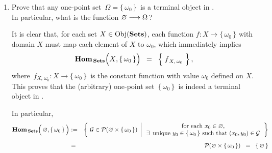 \begin{enumerate}
\item
	Prove that any one-point set \,$\Omega = \{\,\omega_{0}\,\}$\, is a terminal object in \Sets.\\
	In particular, what is the function $\varnothing \longrightarrow \Omega$\,?
	
	\proof
	It is clear that, for each set $X \in \textnormal{Obj}(\textbf{Sets})$, each function $f : X \longrightarrow \{\,\omega_{0}\,\}$
	with domain $X$ must map each element of $X$ to $\omega_{0}$, which immediately implies
	\begin{equation*}
	\Hom_{\,\Sets}\!\left(\overset{{\color{white}.}}{X},\{\,\omega_{0}\,\}\right)
	\;\; = \;\;
		\left\{\; \overset{{\color{white}.}}{f}_{X,\,\omega_{0}} \;\right\},
	\end{equation*}
	where \,$f_{X,\,\omega_{0}} : X \longrightarrow \{\,\omega_{0}\,\}$\,
	is the constant function with value $\omega_{0}$ defined on $X$.
	This proves that the (arbitrary) one-point set \,$\{\,\omega_{0}\,\}$\, is indeed a terminal object in \Sets.
	
	In particular,
	\begin{eqnarray*}
	\Hom_{\,\Sets}\!\left(\,\overset{{\color{white}.}}{\varemptyset},\{\,\omega_{0}\,\}\,\right)
	& := &
		\left\{\;
			\mathcal{G} \in \mathcal{P}(\varemptyset \times \{\,\omega_{0}\,\})
			\;\left\vert\,
			\begin{array}{c}
				\textnormal{for each $x_{0} \in \varemptyset$,}
				\\
				\textnormal{$\exists$\, unique $y_{0} \in \{\,\omega_{0}\,\}$ such that $(x_{0},y_{0}) \in \mathcal{G}$}
			\end{array}
			\right.
		\right\}
	\\
	& \overset{{\color{white}\vert}}{=} &
		\mathcal{P}(\varemptyset \times \{\,\omega_{0}\,\})
	\;\; = \;\;
		\left\{\,\varemptyset\,\right\}
	\end{eqnarray*}

\end{enumerate}



